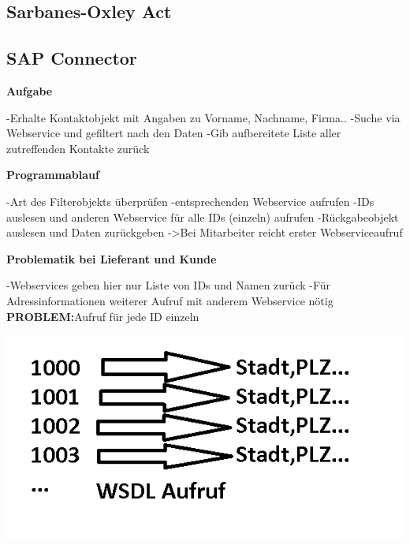 \documentclass[xcolor=dvipsnames, compress, 10pt]{beamer}
\begin{document}
\subsection*{Sarbanes-Oxley Act}

\subsection{SAP Connector}

\begin{frame}
\begin{center}
\textbf{Aufgabe}

-Erhalte Kontaktobjekt mit Angaben zu Vorname, Nachname, Firma..
-Suche via Webservice und gefiltert nach den Daten 
-Gib aufbereitete Liste aller zutreffenden Kontakte zurück


\end{center}
\end{frame}

\begin{frame}
\begin{center}
\textbf{Programmablauf}

-Art des Filterobjekts überprüfen
-entsprechenden Webservice aufrufen
-IDs auslesen und anderen Webservice für alle IDs (einzeln) aufrufen
-Rückgabeobjekt auslesen und Daten zurückgeben
->Bei Mitarbeiter reicht erster Webserviceaufruf


\end{center}
\end{frame}

\begin{frame}
\begin{center}
\textbf{Problematik bei Lieferant und Kunde}

-Webservices geben hier nur Liste von IDs und Namen zurück
-Für Adressinformationen weiterer Aufruf mit anderem Webservice nötig
\textbf{PROBLEM:}Aufruf für jede ID einzeln

\end{center}
\end{frame}

\begin{frame}
\begin{center}

\includegraphics[width=\textheight]{Bilder/presi1.png} 

\end{center}
\end{frame}
\end{document}
